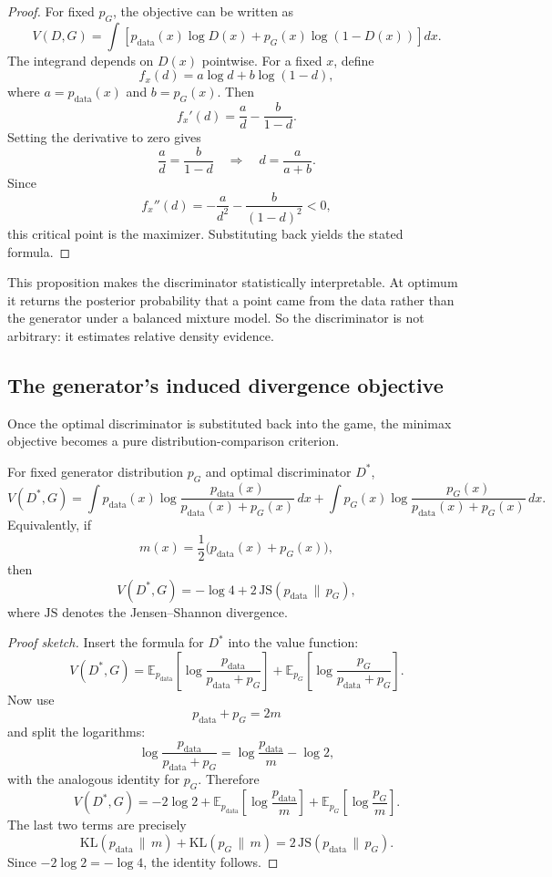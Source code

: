 \begin{proof}
For fixed $p_G$, the objective can be written as
\[
V(D,G)
=
\int \left[p_{\mathrm{data}}(x)\log D(x)+p_G(x)\log(1-D(x))\right]dx.
\]
The integrand depends on $D(x)$ pointwise.
For a fixed $x$, define
\[
f_x(d)=a\log d+b\log(1-d),
\]
where $a=p_{\mathrm{data}}(x)$ and $b=p_G(x)$.
Then
\[
f_x'(d)=\frac{a}{d}-\frac{b}{1-d}.
\]
Setting the derivative to zero gives
\[
\frac{a}{d}=\frac{b}{1-d}
\quad \Longrightarrow \quad
 d = \frac{a}{a+b}.
\]
Since
\[
f_x''(d)=-\frac{a}{d^2}-\frac{b}{(1-d)^2}<0,
\]
this critical point is the maximizer.
Substituting back yields the stated formula.
\end{proof}

This proposition makes the discriminator statistically interpretable.
At optimum it returns the posterior probability that a point came from the data rather than the generator under a balanced mixture model.
So the discriminator is not arbitrary: it estimates relative density evidence.

\subsection*{The generator's induced divergence objective}

Once the optimal discriminator is substituted back into the game, the minimax objective becomes a pure distribution-comparison criterion.

\begin{proposition}
For fixed generator distribution $p_G$ and optimal discriminator $D^*$,
\[
V(D^*,G)
=
\int p_{\mathrm{data}}(x)
\log \frac{p_{\mathrm{data}}(x)}{p_{\mathrm{data}}(x)+p_G(x)}\,dx
+
\int p_G(x)
\log \frac{p_G(x)}{p_{\mathrm{data}}(x)+p_G(x)}\,dx.
\]
Equivalently, if
\[
m(x)=\frac{1}{2}\bigl(p_{\mathrm{data}}(x)+p_G(x)\bigr),
\]
then
\[
V(D^*,G) = -\log 4 + 2\,\mathrm{JS}(p_{\mathrm{data}}\,\|\,p_G),
\]
where $\mathrm{JS}$ denotes the Jensen--Shannon divergence.
\end{proposition}

\begin{proof}[Proof sketch]
Insert the formula for $D^*$ into the value function:
\[
V(D^*,G)
=
\mathbb E_{p_{\mathrm{data}}}
\left[\log \frac{p_{\mathrm{data}}}{p_{\mathrm{data}}+p_G}\right]
+
\mathbb E_{p_G}
\left[\log \frac{p_G}{p_{\mathrm{data}}+p_G}\right].
\]
Now use
\[
p_{\mathrm{data}}+p_G = 2m
\]
and split the logarithms:
\[
\log \frac{p_{\mathrm{data}}}{p_{\mathrm{data}}+p_G}
=
\log \frac{p_{\mathrm{data}}}{m} - \log 2,
\]
with the analogous identity for $p_G$.
Therefore
\[
V(D^*,G)
=
-2\log 2
+
\mathbb E_{p_{\mathrm{data}}}\left[\log \frac{p_{\mathrm{data}}}{m}\right]
+
\mathbb E_{p_G}\left[\log \frac{p_G}{m}\right].
\]
The last two terms are precisely
\[
\mathrm{KL}(p_{\mathrm{data}}\,\|\,m) + \mathrm{KL}(p_G\,\|\,m)
= 2\,\mathrm{JS}(p_{\mathrm{data}}\,\|\,p_G).
\]
Since $-2\log 2=-\log 4$, the identity follows.
\end{proof}

